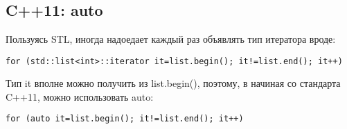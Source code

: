 ﻿\section{}

\subsection{C++11: auto}

Пользуясь \ac{STL}, иногда надоедает каждый раз объявлять тип итератора вроде:

\begin{lstlisting}
for (std::list<int>::iterator it=list.begin(); it!=list.end(); it++)
\end{lstlisting}

Тип it вполне можно получить из list.begin(), поэтому, в начиная со стандарта C++11, можно использовать auto:

\begin{lstlisting}
for (auto it=list.begin(); it!=list.end(); it++)
\end{lstlisting}

